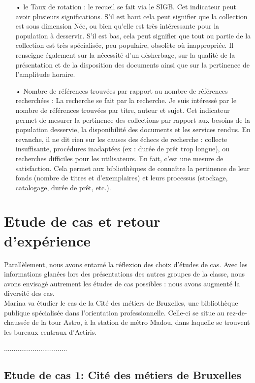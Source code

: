 \documentclass[french,a4paper,12pt]{article}
\begin{document}
{\begin{enumerate}
   \item[•]  le Taux de rotation : le recueil se fait via le SIGB. Cet indicateur peut avoir plusieurs significations. S’il est haut cela peut signifier que la collection est sous dimension 
Née, ou bien qu’elle est très intéressante pour la population à desservir. S’il est bas, cela peut signifier que tout ou partie de la collection est très spécialisée, peu populaire, obsolète où inappropriée. Il renseigne également sur la nécessité d’un désherbage, sur la qualité de la présentation et de la disposition des documents ainsi que sur la pertinence de l’amplitude horaire. 

\item[•]  Nombre de références trouvées par rapport au nombre de références recherchées : La recherche se fait par la recherche. Je suis intéressé par le nombre de références trouvées par titre, auteur et sujet. Cet indicateur permet de mesurer la pertinence des collections par rapport aux besoins de la population desservie, la disponibilité des documents et les services rendus. En revanche, il ne dit rien sur les causes des échecs de recherche : collecte insuffisante, procédures inadaptées (ex : durée de prêt trop longue), ou recherches difficiles pour les utilisateurs. En fait, c'est une mesure de satisfaction. Cela permet aux bibliothèques de connaître la pertinence de leur fonds (nombre de titres et d'exemplaires) et leurs processus (stockage, catalogage, durée de prêt, etc.). 

\end{enumerate}

\newpage
\section{Etude de cas et retour d'expérience}
\quad Parallèlement, nous avons entamé la réflexion des choix d’études de cas. Avec les informations glanées lors des présentations des autres groupes de la classe, nous avons envisagé autrement les études de cas possibles : nous avons augmenté la diversité des cas.\\ 

Marina va étudier le cas de la Cité des métiers de Bruxelles, une bibliothèque publique spécialisée dans l’orientation professionnelle. Celle-ci se situe au rez-de-chaussée de la tour Astro, à la station de métro Madou, dans laquelle se trouvent les bureaux centraux d’Actiris.

.................................\\
\subsection{Etude de cas 1: Cité des métiers de Bruxelles }

}
\end{document}
